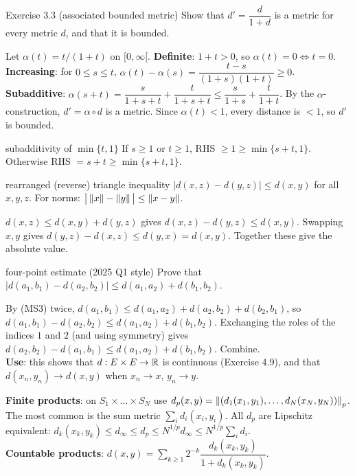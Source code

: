 \begin{exam}{Exercise 3.3 (associated bounded metric)}
Show that $d'=\dfrac{d}{1+d}$ is a metric for every metric $d$, and that it is bounded.
\end{exam}
\begin{answer}
Let $\alpha(t)=t/(1+t)$ on $[0,\infty[$.
\textbf{Definite}: $1+t>0$, so $\alpha(t)=0\iff t=0$.
\textbf{Increasing}: for $0\le s\le t$, $\alpha(t)-\alpha(s)=\dfrac{t-s}{(1+s)(1+t)}\ge0$.
\textbf{Subadditive}: $\alpha(s+t)=\dfrac{s}{1+s+t}+\dfrac{t}{1+s+t}\le\dfrac{s}{1+s}+\dfrac{t}{1+t}$.
By the $\alpha$-construction, $d'=\alpha\circ d$ is a metric. Since $\alpha(t)<1$, every
distance is $<1$, so $d'$ is bounded.
\end{answer}

\begin{example}{subadditivity of $\min\{t,1\}$}
If $s\ge1$ or $t\ge1$, RHS $\ge1\ge\min\{s+t,1\}$. Otherwise RHS $=s+t\ge\min\{s+t,1\}$.
\end{example}

\begin{thm}{rearranged (reverse) triangle inequality}
$|d(x,z)-d(y,z)|\le d(x,y)$ for all $x,y,z$. For norms: $\big|\left\lVert x\right\rVert-\left\lVert y\right\rVert\big|\le\left\lVert x-y\right\rVert$.
\end{thm}
\begin{answer}
$d(x,z)\le d(x,y)+d(y,z)$ gives $d(x,z)-d(y,z)\le d(x,y)$. Swapping $x,y$ gives
$d(y,z)-d(x,z)\le d(y,x)=d(x,y)$. Together these give the absolute value.
\end{answer}

\begin{exam}{four-point estimate (2025 Q1 style)}
Prove that $|d(a_1,b_1)-d(a_2,b_2)|\le d(a_1,a_2)+d(b_1,b_2)$.
\end{exam}
\begin{answer}
By (MS3) twice, $d(a_1,b_1)\le d(a_1,a_2)+d(a_2,b_2)+d(b_2,b_1)$, so
$d(a_1,b_1)-d(a_2,b_2)\le d(a_1,a_2)+d(b_1,b_2)$. Exchanging the roles of the indices $1$ and $2$
(and using symmetry) gives $d(a_2,b_2)-d(a_1,b_1)\le d(a_1,a_2)+d(b_1,b_2)$. Combine.\\
\textbf{Use}: this shows that $d:E\times E\to\mathbb R$ is continuous (Exercise 4.9), and that
$d(x_n,y_n)\to d(x,y)$ when $x_n\to x$, $y_n\to y$.
\end{answer}

\textbf{Finite products}: on $S_1\times\dots\times S_N$ use
$d_p(x,y)=\left\lVert(d_1(x_1,y_1),\dots,d_N(x_N,y_N))\right\rVert_p$. The most common is the sum metric
$\sum_i d_i(x_i,y_i)$. All $d_p$ are Lipschitz equivalent:
$d_k(x_k,y_k)\le d_\infty\le d_p\le N^{1/p}d_\infty\le N^{1/p}\sum_i d_i$.\\
\textbf{Countable products}: $d(x,y)=\sum_{k\ge1}2^{-k}\dfrac{d_k(x_k,y_k)}{1+d_k(x_k,y_k)}$.


